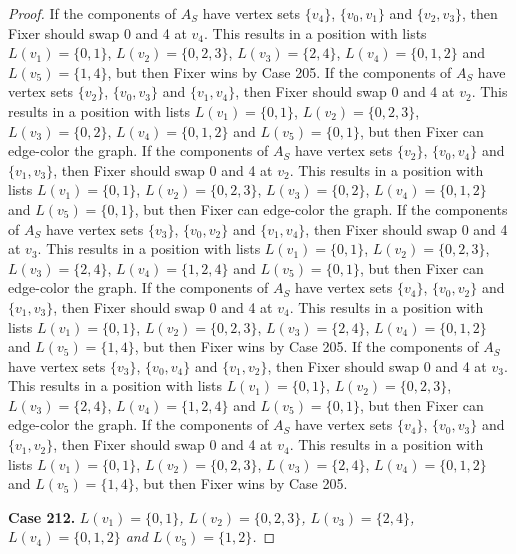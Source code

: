 \documentclass[12pt]{amsart}
\theoremstyle{plain}
\theoremstyle{definition}
\theoremstyle{remark}
\begin{document}
\begin{proof}
If the components of $A_S$ have vertex sets $\{v_4\}$, $\{v_0, v_1\}$ and $\{v_2, v_3\}$, then Fixer should swap 0 and 4 at $v_4$. This results in a position with lists $L(v_1) = \{0, 1\}$, $L(v_2) = \{0, 2, 3\}$, $L(v_3) = \{2, 4\}$, $L(v_4) = \{0, 1, 2\}$ and $L(v_5) = \{1, 4\}$, but then Fixer wins by Case 205.
If the components of $A_S$ have vertex sets $\{v_2\}$, $\{v_0, v_3\}$ and $\{v_1, v_4\}$, then Fixer should swap 0 and 4 at $v_2$. This results in a position with lists $L(v_1) = \{0, 1\}$, $L(v_2) = \{0, 2, 3\}$, $L(v_3) = \{0, 2\}$, $L(v_4) = \{0, 1, 2\}$ and $L(v_5) = \{0, 1\}$, but then Fixer can edge-color the graph.
If the components of $A_S$ have vertex sets $\{v_2\}$, $\{v_0, v_4\}$ and $\{v_1, v_3\}$, then Fixer should swap 0 and 4 at $v_2$. This results in a position with lists $L(v_1) = \{0, 1\}$, $L(v_2) = \{0, 2, 3\}$, $L(v_3) = \{0, 2\}$, $L(v_4) = \{0, 1, 2\}$ and $L(v_5) = \{0, 1\}$, but then Fixer can edge-color the graph.
If the components of $A_S$ have vertex sets $\{v_3\}$, $\{v_0, v_2\}$ and $\{v_1, v_4\}$, then Fixer should swap 0 and 4 at $v_3$. This results in a position with lists $L(v_1) = \{0, 1\}$, $L(v_2) = \{0, 2, 3\}$, $L(v_3) = \{2, 4\}$, $L(v_4) = \{1, 2, 4\}$ and $L(v_5) = \{0, 1\}$, but then Fixer can edge-color the graph.
If the components of $A_S$ have vertex sets $\{v_4\}$, $\{v_0, v_2\}$ and $\{v_1, v_3\}$, then Fixer should swap 0 and 4 at $v_4$. This results in a position with lists $L(v_1) = \{0, 1\}$, $L(v_2) = \{0, 2, 3\}$, $L(v_3) = \{2, 4\}$, $L(v_4) = \{0, 1, 2\}$ and $L(v_5) = \{1, 4\}$, but then Fixer wins by Case 205.
If the components of $A_S$ have vertex sets $\{v_3\}$, $\{v_0, v_4\}$ and $\{v_1, v_2\}$, then Fixer should swap 0 and 4 at $v_3$. This results in a position with lists $L(v_1) = \{0, 1\}$, $L(v_2) = \{0, 2, 3\}$, $L(v_3) = \{2, 4\}$, $L(v_4) = \{1, 2, 4\}$ and $L(v_5) = \{0, 1\}$, but then Fixer can edge-color the graph.
If the components of $A_S$ have vertex sets $\{v_4\}$, $\{v_0, v_3\}$ and $\{v_1, v_2\}$, then Fixer should swap 0 and 4 at $v_4$. This results in a position with lists $L(v_1) = \{0, 1\}$, $L(v_2) = \{0, 2, 3\}$, $L(v_3) = \{2, 4\}$, $L(v_4) = \{0, 1, 2\}$ and $L(v_5) = \{1, 4\}$, but then Fixer wins by Case 205.

\noindent\textbf{Case 212.  }\textit{$L(v_1) = \{0, 1\}$, $L(v_2) = \{0, 2, 3\}$, $L(v_3) = \{2, 4\}$, $L(v_4) = \{0, 1, 2\}$ and $L(v_5) = \{1, 2\}$.}


\end{proof}
\end{document}
